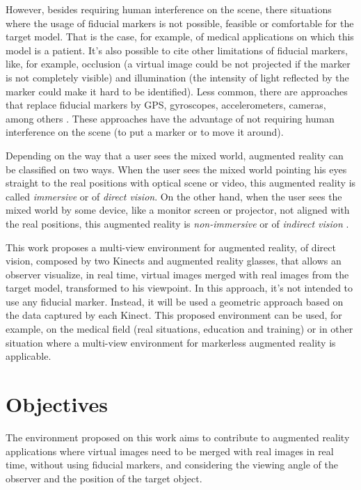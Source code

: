 \documentclass[msc, a4paper, classic, en]{ufbathesis}
\begin{document}
However, besides requiring human interference on the scene, there situations where the usage of fiducial markers is not possible, feasible or comfortable for the target model. That is the case, for example, of medical applications on which this model is a patient. It's also possible to cite other limitations of fiducial markers, like, for example, occlusion (a virtual image could be not projected if the marker is not completely visible) and illumination (the intensity of light reflected by the marker could make it hard to be identified). Less common, there are approaches that replace fiducial markers \cite{carmigniani} \cite{gallo09} by GPS, gyroscopes, accelerometers, cameras, among others \cite{azuma} \cite{azuma01}. These approaches have the advantage of not requiring human interference on the scene (to put a marker or to move it around).

Depending on the way that a user sees the mixed world, augmented reality can be classified on two ways. When the user sees the mixed world pointing his eyes straight to the real positions with optical scene or video, this augmented reality is called \textit{immersive} or of \textit{direct vision}. On the other hand, when the user sees the mixed world by some device, like a monitor screen or projector, not aligned with the real positions, this augmented reality is \textit{non-immersive} or of \textit{indirect vision} \cite{tori2006fundamentos}.

This work proposes a multi-view environment for augmented reality, of direct vision, composed by two Kinects \cite{kinect} and augmented reality glasses, that allows an observer visualize, in real time, virtual images merged with real images from the target model, transformed to his viewpoint. In this approach, it's not intended to use any fiducial marker. Instead, it will be used a geometric approach based on the data captured by each Kinect. This proposed environment can be used, for example, on the medical field (real situations, education and training) or in other situation where a multi-view environment for markerless augmented reality is applicable. 

\section{Objectives}

The environment proposed on this work aims to contribute to augmented reality applications where virtual images need to be merged with real images in real time, without using fiducial markers, and considering the viewing angle of the observer and the position of the target object.
\end{document}

